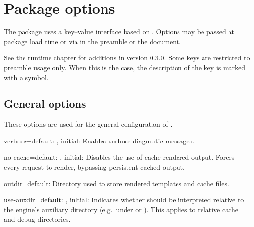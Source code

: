 \section{Package options}
\label{sec:package-options}

The package uses a key--value interface based on . %
Options may be passed at package load time or via  in
the preamble or the document. %

\begin{blockwarning}
  See the runtime chapter for additions in version 0.3.0. Some keys are restricted to preamble usage only. %
  When this is the case, the description of the key is marked with a
  \preambleonly{} symbol. %
\end{blockwarning}

\subsection{General options}
\label{ssec:general-options}

These options are used for the general configuration of . %

\begin{docKey}{verbose}{=\textbar{}}{default:
    , initial: }%
  Enables verbose diagnostic messages.
\end{docKey}
\begin{docKey}{no-cache}{=\textbar{}}{default:
    , initial: }%
  Disables the use of cache-rendered output.%
  Forces every request to render, bypassing persistent cached output.
\end{docKey}
\begin{docKey}[][doc description=\preambleonly]{outdir}{=}{default: }
   Directory used to store rendered templates and cache files. %
\end{docKey}
\begin{docKey}[][doc description=\preambleonly]{use-auxdir}{=\textbar{}}{default:
    , initial: }%
  Indicates whether  should be interpreted relative to the
  engine’s auxiliary directory (e.g.\ under  or
  ). %
  This applies to relative cache and debug directories.
\end{docKey}

